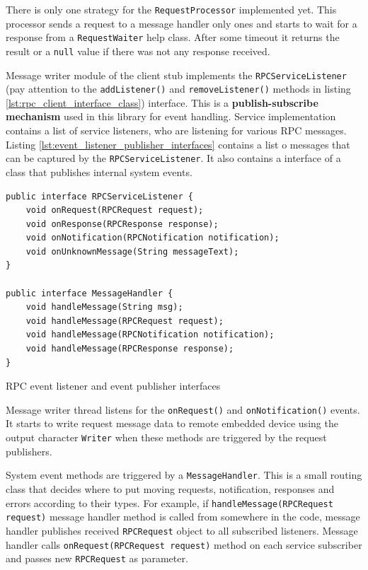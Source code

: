 There is only one strategy for the \texttt{RequestProcessor} implemented yet.
This processor sends a request to a message handler only ones and starts to wait
for a response from a \texttt{RequestWaiter} help class.
After some timeout it returns the result or a \texttt{null} value if there was
not  any response received.

Message writer module of the client stub implements the
\texttt{RPCServiceListener} (pay attention to the 
\texttt{addListener()} and \texttt{removeListener()} methods in listing
\ref{lst:rpc_client_interface_class}) interface. 
This is a \textbf{publish-subscribe mechanism} used in this library for  event
handling.
Service implementation contains a list of service listeners, who are listening
for various RPC messages. 
Listing \ref{lst:event_listener_publisher_interfaces} contains a list o messages that can
be captured by the \texttt{RPCServiceListener}. It also contains a interface of a
class that publishes internal system events.

\begin{listing}[H]
\begin{verbatim}
public interface RPCServiceListener {
    void onRequest(RPCRequest request);
    void onResponse(RPCResponse response);
    void onNotification(RPCNotification notification);
    void onUnknownMessage(String messageText);
}

public interface MessageHandler {
    void handleMessage(String msg);
    void handleMessage(RPCRequest request);
    void handleMessage(RPCNotification notification);
    void handleMessage(RPCResponse response);
}
\end{verbatim}
\caption{RPC event listener and event publisher interfaces}
\label{lst:event_listener_publisher_interfaces}
\end{listing}

Message writer thread listens for the \texttt{onRequest()} and
\texttt{onNotification()} events. It starts to write request message data to
remote embedded device using the output character \texttt{Writer}  when these
methods are triggered by the request publishers.

System event methods are triggered by a
\texttt{MessageHandler}. This is a small routing class that decides where to put
moving requests, notification, responses and errors according to their types. 
For example, if \texttt{handleMessage(RPCRequest request)} message handler
method is called from somewhere in the code, message handler publishes received
\texttt{RPCRequest} object to all subscribed listeners. 
Message handler calls \texttt{onRequest(RPCRequest request)} method on each
service subscriber and passes new \texttt{RPCRequest} as parameter.

